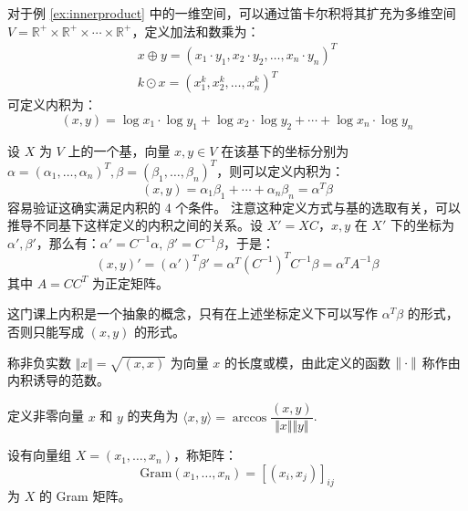 \begin{example}
对于例 \ref{ex:innerproduct} 中的一维空间，可以通过笛卡尔积将其扩充为多维空间 $V=\mathbb R^+\times \mathbb R^+\times\cdots\times \mathbb R^+$，定义加法和数乘为：
\begin{gather*}
    x\oplus y=(x_1\cdot y_1,x_2\cdot y_2,\ldots,x_n\cdot y_n)^T\\
    k\odot x=(x_1^k,x_2^k,\ldots,x_n^k)^T
\end{gather*}
可定义内积为：
\[
    (x,y)=\log x_1\cdot\log y_1+\log x_2\cdot\log y_2+\cdots+\log x_n\cdot\log y_n
\]
\end{example}

\begin{example}[根据坐标定义内积]
设 $X$ 为 $V$ 上的一个基，向量 $x,y\in V$ 在该基下的坐标分别为 $\alpha=(\alpha_1,\ldots,\alpha_n)^T,\beta=(\beta_1,\ldots,\beta_n)^T$，则可以定义内积为：
\[
    (x,y)=\alpha_1\beta_1+\cdots+\alpha_n\beta_n=\alpha^T\beta
\]
容易验证这确实满足内积的 4 个条件。
注意这种定义方式与基的选取有关，可以推导不同基下这样定义的内积之间的关系。设 $X'=XC$，$x,y$ 在 $X'$ 下的坐标为 $\alpha',\beta'$，那么有：$\alpha'=C^{-1}\alpha,\,\beta'=C^{-1}\beta$，于是：
\[
    (x,y)'=(\alpha')^T\beta'=\alpha^T(C^{-1})^TC^{-1}\beta=\alpha^T A^{-1}\beta
\]
其中 $A=CC^T$ 为正定矩阵。
\end{example}

\begin{remark}
这门课上内积是一个抽象的概念，只有在上述坐标定义下可以写作 $\alpha^T\beta$ 的形式，否则只能写成 $(x,y)$ 的形式。
\end{remark}

\begin{definition}[长度/模，由内积诱导的范数]
\label{def:inner-product-norm}
称非负实数 $\Vert x\Vert=\sqrt{(x,x)}$ 为向量 $x$ 的长度或模，由此定义的函数 $\Vert\cdot\Vert$ 称作由内积诱导的范数。
\end{definition}

\begin{definition}[夹角]
定义非零向量 $x$ 和 $y$ 的夹角为 $\langle x,y\rangle=\arccos\dfrac{(x,y)}{\Vert x\Vert\Vert y\Vert}$.
\end{definition}

\begin{definition}[Gram 矩阵]
设有向量组 $X=(x_1,\ldots,x_n)$，称矩阵：
\[
    \text{Gram}(x_1,\ldots,x_n)=[(x_i,x_j)]_{ij}
\]
为 $X$ 的 Gram 矩阵。
\end{definition}

